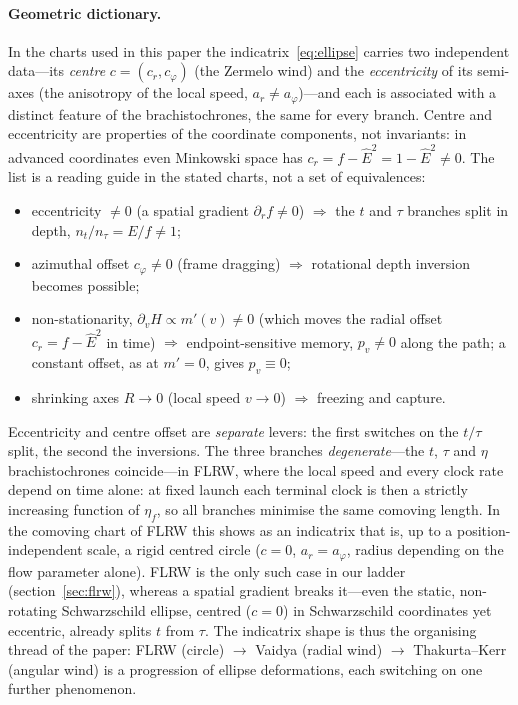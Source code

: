 \documentclass[12pt]{iopart}
\newcommand{\Ehat}{\hat E}
\theoremstyle{plain}
\theoremstyle{definition}
\theoremstyle{plain}
\theoremstyle{remark}
\begin{document}
\paragraph{Geometric dictionary.} In the charts used in this paper the
indicatrix~\eqref{eq:ellipse} carries two independent data---its \emph{centre}
$c=(c_r,c_\varphi)$ (the Zermelo wind) and
the \emph{eccentricity} of its semi-axes (the anisotropy of the local speed,
$a_r\neq a_\varphi$)---and each is associated with a distinct feature of the
brachistochrones, the same for every branch. Centre and eccentricity are properties of the
coordinate components, not invariants: in advanced coordinates even Minkowski space has
$c_r=f-\Ehat^2=1-\Ehat^2\neq0$. The list is a reading guide in the stated charts, not a
set of equivalences:
\begin{itemize}\itemsep2pt
\item eccentricity $\neq0$ (a spatial gradient $\partial_r f\neq0$)
$\Rightarrow$ the $t$ and $\tau$ branches split in depth, $n_t/n_\tau=E/f\neq1$;
\item azimuthal offset $c_\varphi\neq0$ (frame dragging)
$\Rightarrow$ rotational depth inversion becomes possible;
\item non-stationarity, $\partial_vH\propto m'(v)\neq0$ (which moves the radial offset
$c_r=f-\Ehat^2$ in time) $\Rightarrow$ endpoint-sensitive memory, $p_v\neq0$ along the
path; a constant offset, as at $m'=0$, gives $p_v\equiv0$;
\item shrinking axes $R\to0$ (local speed $v\to0$) $\Rightarrow$ freezing and
capture.
\end{itemize}
Eccentricity and centre offset are \emph{separate} levers: the first switches on
the $t/\tau$ split, the second the inversions. The three branches
\emph{degenerate}---the $t$, $\tau$ and $\eta$ brachistochrones coincide---in FLRW, where the local speed and every
clock rate depend on time alone: at fixed launch each terminal clock is then a strictly
increasing function of $\eta_f$, so all branches minimise the same comoving length. In
the comoving chart of FLRW this shows as an
indicatrix that is, up to a position-independent scale, a rigid centred circle ($c=0$,
$a_r=a_\varphi$, radius depending on the flow parameter alone). FLRW is the only such
case in our ladder (section~\ref{sec:flrw}), whereas a spatial gradient breaks it---even
the static, non-rotating Schwarzschild ellipse, centred ($c=0$) in Schwarzschild
coordinates yet eccentric, already splits $t$ from $\tau$. The indicatrix
shape is thus the organising thread of the paper: FLRW (circle) $\to$ Vaidya
(radial wind) $\to$ Thakurta--Kerr (angular wind) is a progression of ellipse
deformations, each switching on one further phenomenon.
\end{document}
